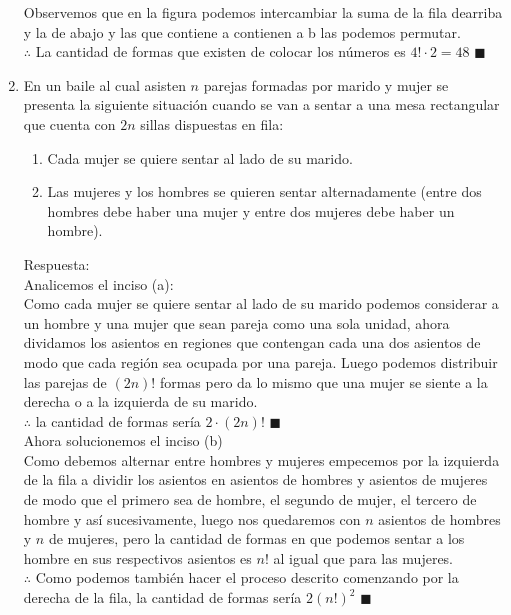 \documentclass{book}
\begin{document}
\begin{enumerate}
\begin{center}
          \end{center}
          Observemos que en la figura podemos intercambiar la suma de la fila dearriba y la de abajo y las que contiene a contienen a b las podemos permutar.\\
          $\therefore$ La cantidad de formas que existen de colocar los números es $4!\cdot 2=48$ $\blacksquare$\\
          
    \item En un baile al cual asisten $n$ parejas formadas por marido y mujer se presenta la siguiente situación cuando se van a sentar a una mesa rectangular que cuenta con $2n$ sillas dispuestas en fila:
          \begin{enumerate}
              \item Cada mujer se quiere sentar al lado de su marido.
              \item Las mujeres y los hombres se quieren sentar alternadamente (entre dos hombres debe haber una mujer y entre dos mujeres debe haber un hombre).
          \end{enumerate}
          Respuesta:\\
          Analicemos el inciso (a):\\
          Como cada mujer se quiere sentar al lado de su marido podemos considerar a un hombre y una mujer que sean pareja como una sola unidad, ahora dividamos los asientos en regiones que contengan cada una dos asientos de modo que cada región sea ocupada por una pareja. Luego podemos distribuir las parejas de $(2n)!$ formas pero da lo mismo que una mujer se siente a la derecha o a la izquierda de su marido.\\
          $\therefore$ la cantidad de formas sería $2\cdot(2n)!$ $\blacksquare$\\
          Ahora solucionemos el inciso (b)\\
          Como debemos alternar entre hombres y mujeres empecemos por la izquierda de la fila a dividir los asientos en asientos de hombres y asientos de mujeres de modo que el primero sea de hombre, el segundo de mujer, el tercero de hombre y así sucesivamente, luego nos quedaremos con $n$ asientos de hombres y $n$ de mujeres, pero la cantidad de formas en que podemos sentar a los hombre en sus respectivos asientos es $n!$ al igual que para las mujeres.\\
          $\therefore$ Como podemos también hacer el proceso descrito comenzando por la derecha de la fila, la cantidad de formas sería $2{(n!)}^2$ $\blacksquare$\\

\end{enumerate}
\end{document}
